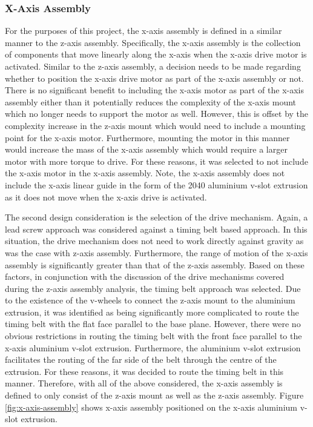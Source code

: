 \subsubsection{X-Axis Assembly}

For the purposes of this project, the x-axis assembly is defined in a similar manner to the z-axis assembly. Specifically, the x-axis assembly is the collection of components that move linearly along the x-axis when the x-axis drive motor is activated. Similar to the z-axis assembly, a decision needs to be made regarding whether to position the x-axis drive motor as part of the x-axis assembly or not. There is no significant benefit to including the x-axis motor as part of the x-axis assembly either than it potentially reduces the complexity of the x-axis mount which no longer needs to support the motor as well. However, this is offset by the complexity increase in the z-axis mount which would need to include a mounting point for the x-axis motor. Furthermore, mounting the motor in this manner would increase the mass of the x-axis assembly which would require a larger motor with more torque to drive. For these reasons, it was selected to not include the x-axis motor in the x-axis assembly. Note, the x-axis assembly does not include the x-axis linear guide in the form of the 2040 aluminium v-slot extrusion as it does not move when the x-axis drive is activated.

The second design consideration is the selection of the drive mechanism. Again, a lead screw approach was considered against a timing belt based approach. In this situation, the drive mechanism does not need to work directly against gravity as was the case with z-axis assembly. Furthermore, the range of motion of the x-axis assembly is significantly greater than that of the z-axis assembly. Based on these factors, in conjunction with the discussion of the drive mechanisms covered during the z-axis assembly analysis, the timing belt approach was selected. Due to the existence of the v-wheels to connect the z-axis mount to the aluminium extrusion, it was identified as being significantly more complicated to route the timing belt with the flat face parallel to the base plane. However, there were no obvious restrictions in routing the timing belt with the front face parallel to the x-axis aluminium v-slot extrusion. Furthermore, the aluminium v-slot extrusion facilitates the routing of the far side of the belt through the centre of the extrusion. For these reasons, it was decided to route the timing belt in this manner. Therefore, with all of the above considered, the x-axis assembly is defined to only consist of the z-axis mount as well as the z-axis assembly. Figure \ref{fig:x-axis-assembly} shows x-axis assembly positioned on the x-axis aluminium v-slot extrusion.


